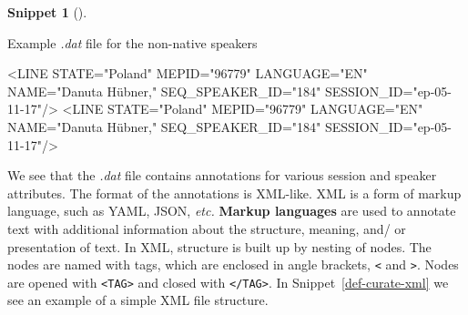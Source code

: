 \documentclass[
  letterpaper,
  krantz1]{latex/krantz-mod}
\newenvironment{Shaded}{\begin{snugshade}}{\end{snugshade}}
\newcommand{\KeywordTok}[1]{\textcolor[rgb]{0.00,0.00,0.00}{#1}}
\newcommand{\NormalTok}[1]{\textcolor[rgb]{0.00,0.00,0.00}{#1}}
\newcommand{\OtherTok}[1]{\textcolor[rgb]{0.00,0.00,0.00}{#1}}
\newcommand{\StringTok}[1]{\textcolor[rgb]{0.00,0.00,0.00}{#1}}
\theoremstyle{definition}
\theoremstyle{definition}
\newtheorem{definition}{Snippet}[chapter]
\theoremstyle{remark}
\begin{document}
\begin{definition}[]\protect\hypertarget{def-curate-enntt-nonnatives-dat}{}\label{def-curate-enntt-nonnatives-dat}

Example \emph{.dat} file for the non-native speakers

\begin{Shaded}
\begin{Highlighting}[]
\NormalTok{\textless{}}\KeywordTok{LINE}\OtherTok{ STATE=}\StringTok{"Poland"}\OtherTok{ MEPID=}\StringTok{"96779"}\OtherTok{ LANGUAGE=}\StringTok{"EN"}\OtherTok{ NAME=}\StringTok{"Danuta Hübner,"}\OtherTok{ SEQ\_SPEAKER\_ID=}\StringTok{"184"}\OtherTok{ SESSION\_ID=}\StringTok{"ep{-}05{-}11{-}17"}\NormalTok{/\textgreater{}}
\NormalTok{\textless{}}\KeywordTok{LINE}\OtherTok{ STATE=}\StringTok{"Poland"}\OtherTok{ MEPID=}\StringTok{"96779"}\OtherTok{ LANGUAGE=}\StringTok{"EN"}\OtherTok{ NAME=}\StringTok{"Danuta Hübner,"}\OtherTok{ SEQ\_SPEAKER\_ID=}\StringTok{"184"}\OtherTok{ SESSION\_ID=}\StringTok{"ep{-}05{-}11{-}17"}\NormalTok{/\textgreater{}}
\end{Highlighting}
\end{Shaded}

\end{definition}

We see that the \emph{.dat} file contains annotations for various
session and speaker attributes. The format of the annotations is
XML-like. XML is a form of markup language, such as YAML, JSON,
\emph{etc.} \textbf{Markup languages} are used to annotate text with
additional information about the structure, meaning, and/ or
presentation of text. In XML, structure is built up by nesting of nodes.
The nodes are named with tags, which are enclosed in angle brackets,
\texttt{\textless{}} and \texttt{\textgreater{}}. Nodes are opened with
\texttt{\textless{}TAG\textgreater{}} and closed with
\texttt{\textless{}/TAG\textgreater{}}. In Snippet~\ref{def-curate-xml}
we see an example of a simple XML file structure.

\pagebreak
\end{document}
